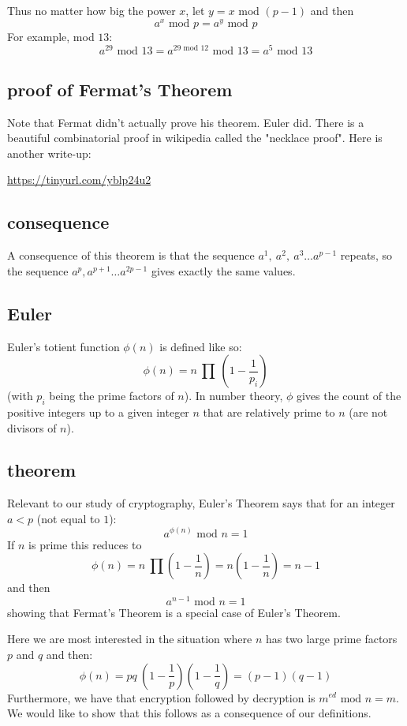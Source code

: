 \documentclass[11pt, oneside]{article}
\begin{document}
Thus no matter how big the power $x$, let $y = x \text{ mod } (p-1)$ and then
\[ a^x \text{ mod } p = a^{y} \text{ mod } p \]
For example, mod $13$:
\[ a^{29} \text{ mod } 13 = a^{29 \text{ mod } 12} \text{ mod } 13 = a^5  \text{ mod } 13 \]

\subsection*{proof of Fermat's Theorem}

Note that Fermat didn't actually prove his theorem.  Euler did.  There is a beautiful combinatorial proof in wikipedia called the "necklace proof".  Here is another write-up:

\url{https://tinyurl.com/yblp24u2}
\subsection*{consequence}
A consequence of this theorem is that the sequence $a^1, \ a^2, \ a^3 \dots a^{p-1}$ repeats, so the sequence $a^{p}, a^{p+1} \dots a^{2p - 1}$ gives exactly the same values.

\subsection*{Euler}
Euler's totient function $\phi(n)$ is defined like so:
\[ \phi(n) = n \ \prod \ (1 - \frac{1}{p_i}) \]
(with $p_i$ being the prime factors of $n$).  In number theory, $\phi$ gives the count of the positive integers up to a given integer $n$ that are relatively prime to $n$ (are not divisors of $n$).

\subsection*{theorem}
Relevant to our study of cryptography, Euler's Theorem says that for an integer $a < p$ (not equal to $1$):
\[ a^{\phi(n)} \text{ mod } n = 1 \]
If $n$ is prime this reduces to 
\[ \phi(n) = n \ \prod (1 - \frac{1}{n}) =  n(1 -  \frac{1}{n}) = n - 1 \]
and then
\[ a^{n-1} \text{ mod } n = 1 \]
showing that Fermat's Theorem is a special case of Euler's Theorem.

Here we are most interested in the situation where $n$ has two large prime factors $p$ and $q$ and then:
\[ \phi(n) = pq \ (1 - \frac{1}{p}) (1 - \frac{1}{q}) = (p - 1)(q - 1)  \]
Furthermore, we have that encryption followed by decryption is $m^{ed} \text{ mod } n = m$.  We would like to show that this follows as a consequence of our definitions.  
\end{document}

